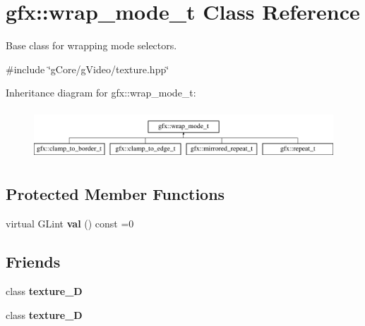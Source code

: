 \hypertarget{classgfx_1_1wrap__mode__t}{\section{gfx\-:\-:wrap\-\_\-mode\-\_\-t Class Reference}
\label{classgfx_1_1wrap__mode__t}
}


Base class for wrapping mode selectors.  




{\ttfamily \#include \char`\"{}g\-Core/g\-Video/texture.\-hpp\char`\"{}}

Inheritance diagram for gfx\-:\-:wrap\-\_\-mode\-\_\-t\-:\begin{figure}[H]
\begin{center}
\leavevmode
\includegraphics[height=1.891892cm]{classgfx_1_1wrap__mode__t}
\end{center}
\end{figure}
\subsection*{Protected Member Functions}
\begin{DoxyCompactItemize}
\item 
\hypertarget{classgfx_1_1wrap__mode__t_ac6e1180c3c8fc8e2dff3fb6825c5cfb9}{virtual G\-Lint {\bfseries val} () const =0}\label{classgfx_1_1wrap__mode__t_ac6e1180c3c8fc8e2dff3fb6825c5cfb9}

\end{DoxyCompactItemize}
\subsection*{Friends}
\begin{DoxyCompactItemize}
\item 
\hypertarget{classgfx_1_1wrap__mode__t_a2039d67f6166ccf823c78e3476aad9aa}{class {\bfseries texture\-\_\-D}}\label{classgfx_1_1wrap__mode__t_a2039d67f6166ccf823c78e3476aad9aa}

\item 
\hypertarget{classgfx_1_1wrap__mode__t_a22ad86ef46c3b17357a0cd59e50bc7dd}{class {\bfseries texture\-\_\-D}}\label{classgfx_1_1wrap__mode__t_a22ad86ef46c3b17357a0cd59e50bc7dd}

\end{DoxyCompactItemize}


